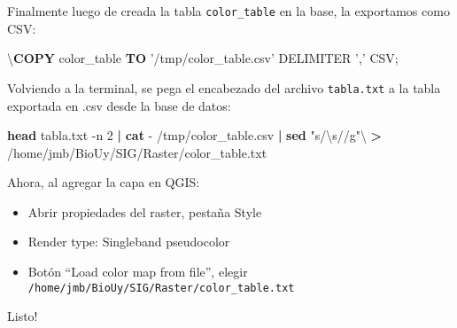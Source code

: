 \documentclass[spanish,]{article}
\newenvironment{Shaded}{}{}
\newcommand{\KeywordTok}[1]{\textcolor[rgb]{0.00,0.44,0.13}{\textbf{{#1}}}}
\newcommand{\StringTok}[1]{\textcolor[rgb]{0.25,0.44,0.63}{{#1}}}
\newcommand{\NormalTok}[1]{{#1}}
\providecommand{\tightlist}{%
  \setlength{\itemsep}{0pt}\setlength{\parskip}{0pt}}
\begin{document}
Finalmente luego de creada la tabla \texttt{color\_table} en la base, la
exportamos como CSV:

\begin{Shaded}
\begin{Highlighting}[]
\NormalTok{\textbackslash{}}\KeywordTok{COPY} \NormalTok{color_table }\KeywordTok{TO} \StringTok{'/tmp/color_table.csv'} \NormalTok{DELIMITER }\StringTok{','} \NormalTok{CSV;}
\end{Highlighting}
\end{Shaded}

Volviendo a la terminal, se pega el encabezado del archivo
\texttt{tabla.txt} a la tabla exportada en .csv desde la base de datos:

\begin{Shaded}
\begin{Highlighting}[]
\KeywordTok{head} \NormalTok{tabla.txt -n 2 }\KeywordTok{|} \KeywordTok{cat} \NormalTok{- /tmp/color_table.csv }\KeywordTok{|} \KeywordTok{sed} \StringTok{"s/\textbackslash{}s//g"}\NormalTok{\textbackslash{}}
  \KeywordTok{>} \NormalTok{/home/jmb/BioUy/SIG/Raster/color_table.txt}
\end{Highlighting}
\end{Shaded}

Ahora, al agregar la capa en QGIS:

\begin{itemize}
\tightlist
\item
  Abrir propiedades del raster, pestaña Style
\item
  Render type: Singleband pseudocolor
\item
  Botón ``Load color map from file'', elegir
  \texttt{/home/jmb/BioUy/SIG/Raster/color\_table.txt}
\end{itemize}

Listo!
\end{document}
